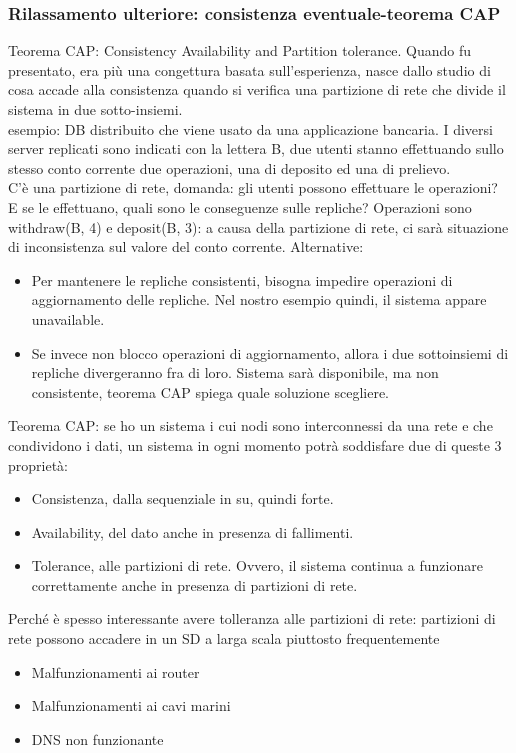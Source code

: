 \documentclass[16px]{article}
\begin{document}
\subsubsection{Rilassamento ulteriore: consistenza eventuale-teorema CAP}
Teorema CAP: Consistency Availability and Partition tolerance. Quando fu presentato, era più una congettura basata sull'esperienza, nasce dallo studio di cosa accade alla consistenza quando si verifica una partizione di rete che divide il sistema in due sotto-insiemi.\\ esempio: DB distribuito che viene usato da una applicazione bancaria. I diversi server replicati sono indicati con la lettera B, due utenti stanno effettuando sullo stesso conto corrente due operazioni, una di deposito ed una di prelievo.\\ C'è una partizione di rete, domanda: gli utenti possono effettuare le operazioni? E se le effettuano, quali sono le conseguenze sulle repliche? Operazioni sono withdraw(B, 4) e deposit(B, 3): a causa della partizione di rete, ci sarà situazione di inconsistenza sul valore del conto corrente. Alternative:
\begin{itemize}
\item Per mantenere le repliche consistenti, bisogna impedire operazioni di aggiornamento delle repliche. Nel nostro esempio quindi, il sistema appare unavailable. 
\item Se  invece non blocco operazioni di aggiornamento, allora i due sottoinsiemi di repliche divergeranno fra di loro. Sistema sarà disponibile, ma non consistente, teorema CAP spiega quale soluzione scegliere.
\end{itemize}
Teorema CAP: se ho un sistema i cui nodi sono interconnessi da una rete e che condividono i dati, un sistema in ogni momento potrà soddisfare due di queste 3 proprietà:
\begin{itemize}
\item Consistenza, dalla sequenziale in su, quindi forte.
\item Availability, del dato anche in presenza di fallimenti.
\item Tolerance, alle partizioni di rete. Ovvero, il sistema continua a funzionare correttamente anche in presenza di partizioni di rete.
\end{itemize}
Perché è spesso interessante avere tolleranza alle partizioni di rete: partizioni di rete possono accadere in un SD a larga scala piuttosto frequentemente
\begin{itemize}
\item Malfunzionamenti ai router 
\item Malfunzionamenti ai cavi marini
\item DNS non funzionante
\end{itemize}
\end{document}
